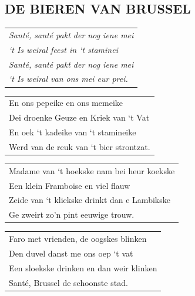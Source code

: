 \documentclass[a4paper, 14pt]{extarticle}
\begin{document}
\subsection*{DE BIEREN VAN BRUSSEL}
\begin{flushleft}
\begin{tabularx}{0.8\textwidth} {
   >{\raggedright\arraybackslash}X}
   \textit{Santé, santé pakt der nog iene mei}\\
\textit{‘t Is weiral feest in ‘t staminei}\\
\textit{Santé, santé pakt der nog iene mei}\\
\textit{‘t Is weiral van ons mei eur prei.}\\
\end{tabularx}
\end{flushleft}\begin{flushleft}
\begin{tabularx}{0.8\textwidth} {
   >{\raggedright\arraybackslash}X}
   En ons pepeike en ons memeike\\
Dei droenke Geuze en Kriek van ‘t Vat\\
En oek ‘t kadeike van ‘t stamineike\\
Werd van de reuk van ‘t bier strontzat.\\
\end{tabularx}
\end{flushleft}\begin{flushleft}
\begin{tabularx}{0.8\textwidth} {
   >{\raggedright\arraybackslash}X}
   Madame van ‘t hoekske nam bei heur koekske\\
Een klein Framboise en viel flauw\\
Zeide van ‘t kliekske drinkt dan e Lambikske\\
Ge zweirt zo’n pint eeuwige trouw.\\
\end{tabularx}
\end{flushleft}\begin{flushleft}
\begin{tabularx}{0.8\textwidth} {
   >{\raggedright\arraybackslash}X}
Faro met vrienden, de oogskes blinken\\
Den duvel danst me ons oep ‘t vat\\
Een sloekske drinken en dan weir klinken\\
Santé, Brussel de schoonste stad.\\
\end{tabularx}
\end{flushleft}
\end{document}

